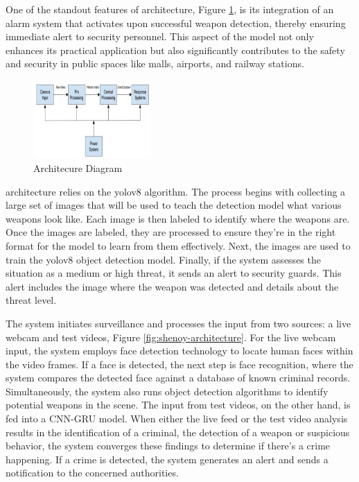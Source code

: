 One of the standout features of \citet{rfc6} architecture, Figure \ref{fig:gawade-architecture}, is its integration of an alarm system that activates upon successful weapon detection, thereby ensuring immediate alert to security personnel. This aspect of the model not only enhances its practical application but also significantly contributes to the safety and security in public spaces like malls, airports, and railway stations.
\begin{figure}[h]
    \centering 
    \includegraphics[width=0.4\textwidth]{figs/Gawade-architecture.png} 
    \caption{\citet{rfc6} Architecure Diagram}
    \label{fig:gawade-architecture}
\end{figure}

\citet{rfc17} architecture relies on the \ac{yolo}v8 algorithm. The process begins with collecting a large set of images that will be used to teach the detection model what various weapons look like. Each image is then labeled to identify where the weapons are. Once the images are labeled, they are processed to ensure they're in the right format for the model to learn from them effectively. Next, the images are used to train the \ac{yolo}v8 object detection model. Finally, if the system assesses the situation as a medium or high threat, it sends an alert to security guards. This alert includes the image where the weapon was detected and details about the threat level.

The \citet{rfc7} system initiates surveillance and processes the input from two sources: a live webcam and test videos, Figure \ref{fig:shenoy-architecture}. For the live webcam input, the system employs face detection technology to locate human faces within the video frames. If a face is detected, the next step is face recognition, where the system compares the detected face against a database of known criminal records. Simultaneously, the system also runs object detection algorithms to identify potential weapons in the scene. The input from test videos, on the other hand, is fed into a CNN-GRU model. When either the live feed or the test video analysis results in the identification of a criminal, the detection of a weapon or suspicious behavior, the system converges these findings to determine if there's a crime happening. If a crime is detected, the system generates an alert and sends a notification to the concerned authorities.

